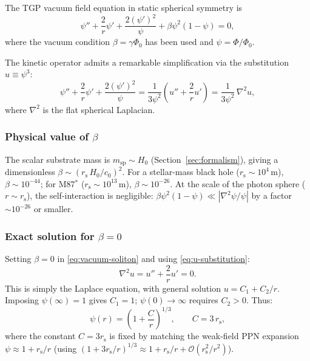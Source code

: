 \documentclass[11pt,a4paper]{article}
\theoremstyle{definition}
\theoremstyle{remark}
\newcommand{\PhiZero}{\varPhi_0}
\newcommand{\rs}{r_{\mathrm{s}}}
\renewcommand{\Phi}{\varPhi}
\begin{document}
The TGP vacuum field equation in static spherical symmetry is
\begin{equation}\label{eq:vacuum-soliton}
  \psi'' + \frac{2}{r}\psi' + \frac{2(\psi')^2}{\psi}
  + \beta\psi^2(1 - \psi) = 0,
\end{equation}
where the vacuum condition $\beta = \gamma\PhiZero$ has been used and
$\psi = \Phi/\PhiZero$.

The kinetic operator admits a remarkable simplification via the
substitution $u \equiv \psi^3$:
\begin{equation}\label{eq:u-substitution}
  \psi'' + \frac{2}{r}\psi' + \frac{2(\psi')^2}{\psi}
  = \frac{1}{3\psi^2}\left(u'' + \frac{2}{r}u'\right)
  = \frac{1}{3\psi^2}\,\nabla^2 u,
\end{equation}
where $\nabla^2$ is the flat spherical Laplacian.

\subsubsection{Physical value of $\beta$}

The scalar substrate mass is $m_{\mathrm{sp}} \sim H_0$
(Section~\ref{sec:formalism}), giving a dimensionless
$\beta \sim (\rs\,H_0/c_0)^2$.  For a stellar-mass black hole
($\rs \sim 10^{4}\,\mathrm{m}$),
$\beta \sim 10^{-44}$; for M87$^{*}$ ($\rs \sim 10^{13}\,\mathrm{m}$),
$\beta \sim 10^{-26}$.  At the scale of the photon sphere
($r \sim \rs$), the self-interaction is negligible:
$\beta\psi^2(1-\psi) \ll |\nabla^2\psi/\psi|$ by a factor
$\sim 10^{-26}$ or smaller.

\subsubsection{Exact solution for $\beta = 0$}

Setting $\beta = 0$ in \eqref{eq:vacuum-soliton} and using
\eqref{eq:u-substitution}:
\begin{equation}
  \nabla^2 u = u'' + \frac{2}{r}u' = 0.
\end{equation}
This is simply the Laplace equation, with general solution
$u = C_1 + C_2/r$.  Imposing $\psi(\infty) = 1$ gives $C_1 = 1$;
$\psi(0) \to \infty$ requires $C_2 > 0$.  Thus:
\begin{equation}\label{eq:soliton-exact}
  \boxed{\psi(r) = \left(1 + \frac{C}{r}\right)^{1/3},
  \qquad C = 3\,\rs,}
\end{equation}
where the constant $C = 3\rs$ is fixed by matching the weak-field
PPN expansion $\psi \approx 1 + \rs/r$ (using
$(1+3\rs/r)^{1/3} \approx 1 + \rs/r + \mathcal{O}(\rs^2/r^2)$).
\end{document}
